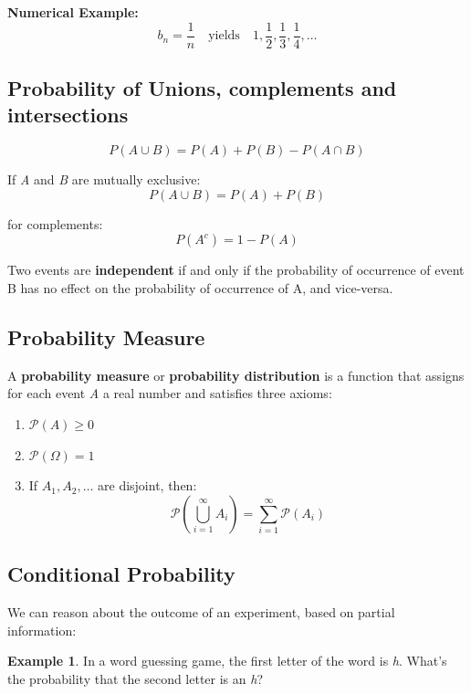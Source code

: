\documentclass[12pt]{book}
\theoremstyle{definition}
\newtheorem{exmp}{Example}[section]
\begin{document}
\textbf{Numerical Example:}
\[
b_n = \frac{1}{n} \quad \text{yields} \quad 1, \frac{1}{2}, \frac{1}{3}, \frac{1}{4}, \dots
\]

\begin{center}
\end{center}


\subsection{Probability of Unions, complements and intersections}
\[
    P(A \cup B) = P(A) + P(B) - P(A \cap B)
\]

If \textit{A} and \textit{B} are mutually exclusive:
\[
    P(A \cup B) = P(A) + P(B)
\]

for complements:
\[
    P(A^c) = 1 - P(A)
\]

Two events are \textbf{independent} if and only if the probability of occurrence of event B has no effect on the probability of occurrence of A, and vice-versa.

\subsection{Probability Measure}
A \textbf{probability measure} or \textbf{probability distribution} is a function that assigns for each event \textit{A} a real number and satisfies three axioms:

\begin{enumerate}
    \item $\mathcal{P}(A) \geq 0$
    \item $\mathcal{P}(\Omega) = 1$
    \item If $A_1, A_2, \dots$ are disjoint, then: 
    \[
        \mathcal{P}(\bigcup_{i = 1}^{\infty} A_i) = \sum_{i = 1}^{\infty} \mathcal{P}(A_i)
    \]
\end{enumerate}

\subsection{Conditional Probability}
We can reason about the outcome of an experiment, based on partial information:
\begin{exmp}
    In a word guessing game, the first letter of the word is \textit{h}. What's the probability that the second letter is an \textit{h}?
\end{exmp}
\end{document}

